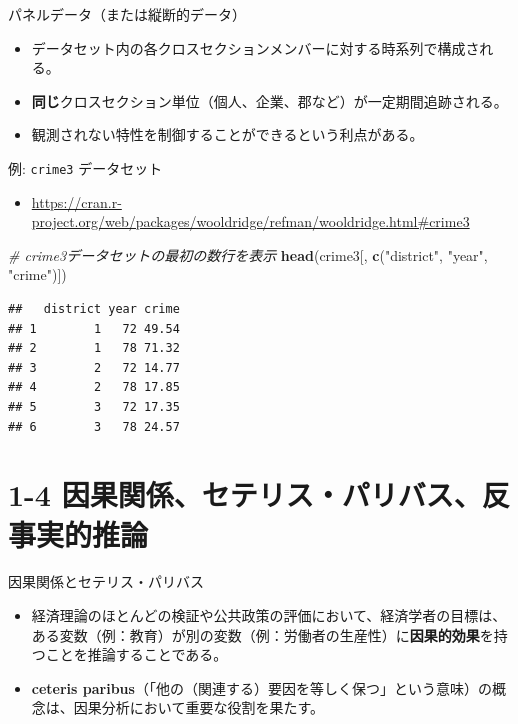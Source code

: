 \documentclass[
  ignorenonframetext,
]{beamer}
\newenvironment{Shaded}{\begin{snugshade}}{\end{snugshade}}
\newcommand{\CommentTok}[1]{\textcolor[rgb]{0.56,0.35,0.01}{\textit{#1}}}
\newcommand{\FunctionTok}[1]{\textcolor[rgb]{0.13,0.29,0.53}{\textbf{#1}}}
\newcommand{\NormalTok}[1]{#1}
\newcommand{\StringTok}[1]{\textcolor[rgb]{0.31,0.60,0.02}{#1}}
\providecommand{\tightlist}{%
  \setlength{\itemsep}{0pt}\setlength{\parskip}{0pt}}
\begin{document}
\begin{frame}{パネルデータ（または縦断的データ）}
\label{ux30d1ux30cdux30ebux30c7ux30fcux30bfux307eux305fux306fux7e26ux65adux7684ux30c7ux30fcux30bf}
\begin{itemize}
\tightlist
\item
  データセット内の各クロスセクションメンバーに対する時系列で構成される。
\item
  \textbf{同じ}クロスセクション単位（個人、企業、郡など）が一定期間追跡される。
\item
  観測されない特性を制御することができるという利点がある。
\end{itemize}
\end{frame}

\begin{frame}[fragile]{例: \texttt{crime3} データセット}
\label{ux4f8b-crime3-ux30c7ux30fcux30bfux30bbux30c3ux30c8}
\begin{itemize}
\tightlist
\item
  \url{https://cran.r-project.org/web/packages/wooldridge/refman/wooldridge.html\#crime3}
\end{itemize}

\begin{Shaded}
\begin{Highlighting}[]
\CommentTok{\# crime3データセットの最初の数行を表示}
\FunctionTok{head}\NormalTok{(crime3[, }\FunctionTok{c}\NormalTok{(}\StringTok{"district"}\NormalTok{, }\StringTok{"year"}\NormalTok{, }\StringTok{"crime"}\NormalTok{)])}
\end{Highlighting}
\end{Shaded}

\begin{verbatim}
##   district year crime
## 1        1   72 49.54
## 2        1   78 71.32
## 3        2   72 14.77
## 4        2   78 17.85
## 5        3   72 17.35
## 6        3   78 24.57
\end{verbatim}
\end{frame}

\section{1-4
因果関係、セテリス・パリバス、反事実的推論}\label{ux56e0ux679cux95a2ux4fc2ux30bbux30c6ux30eaux30b9ux30d1ux30eaux30d0ux30b9ux53cdux4e8bux5b9fux7684ux63a8ux8ad6}

\begin{frame}{因果関係とセテリス・パリバス}
\label{ux56e0ux679cux95a2ux4fc2ux3068ux30bbux30c6ux30eaux30b9ux30d1ux30eaux30d0ux30b9}
\begin{itemize}
\tightlist
\item
  経済理論のほとんどの検証や公共政策の評価において、経済学者の目標は、ある変数（例：教育）が別の変数（例：労働者の生産性）に\textbf{因果的効果}を持つことを推論することである。
\item
  \textbf{ceteris
  paribus}（「他の（関連する）要因を等しく保つ」という意味）の概念は、因果分析において重要な役割を果たす。
\end{itemize}
\end{frame}
\end{document}
